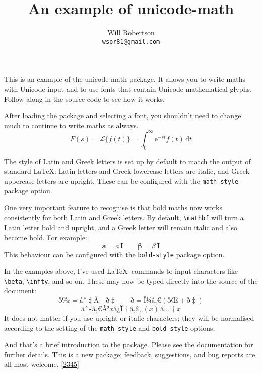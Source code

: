 \documentclass{article}
\begin{document}
\title{An example of \textsf{unicode-math}}
\author{Will Robertson\\\texttt{wspr81@gmail.com}}
\maketitle

This is an example of the \textsf{unicode-math} package.
It allows you to write maths with Unicode input and to use fonts that contain Unicode mathematical glyphs. Follow along in the source code to see how it works.

After loading the package and selecting a font, you shouldn't need to change much to continue to write maths as always.
\[
   F(s)=\mathscr L \{f(t)\}=\int_0^\infty \mathrm e^{-st}f(t)\,\mathrm d t 
\]

The style of Latin and Greek letters is set up by default to match the output of standard \LaTeX: Latin letters and Greek lowercase letters are italic, and Greek uppercase letters are upright. These can be configured with the \texttt{math-style} package option.

One very important feature to recognise is that bold maths now works consistently for both Latin and Greek letters. By default, \verb|\mathbf| will turn a Latin letter bold and upright, and a Greek letter will remain italic and also become bold. For example:
\[
  \mathbf{a} = a\,\mathbf{I} \qquad \mathbf{\beta} = \beta\,\mathbf{I}
\]
This behaviour can be configured with the \texttt{bold-style} package option.

In the examples above, I've used \LaTeX\ commands to input characters like \verb|\beta|, \verb|\infty|, and so on. These may now be typed directly into the source of the document:
\[
   ð‰ = âˆ‡Ã—ð‡ \qquad ð = Î¼â‚€(ðŒ + ð‡)
\]
\[
  âˆ«â‚€Â³ xâ¿Ï†â‚â‚‚(x)\,â…†x
\]
It does not matter if you use upright or italic characters; they will be normalised according to the setting of the \texttt{math-style} and \texttt{bold-style} options.

And that's\label{2345} a brief introduction to the package. Please see the documentation for further details. This is a new package; feedback, suggestions, and bug reports are all most welcome.
\ref{2345}
\end{document}
